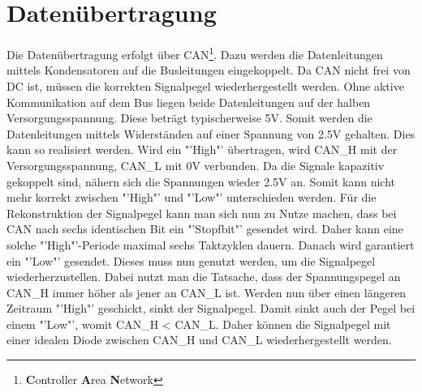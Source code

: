 \section{Datenübertragung}
Die Datenübertragung erfolgt über 
CAN\footnote{\textbf{C}ontroller \textbf{A}rea \textbf{N}etwork}. Dazu werden 
die Datenleitungen mittels Kondensatoren auf die Busleitungen eingekoppelt. Da 
CAN nicht frei von DC ist, müssen die korrekten Signalpegel wiederhergestellt 
werden. Ohne aktive Kommunikation auf dem Bus liegen beide Datenleitungen auf 
der halben Versorgungsspannung. Diese beträgt typischerweise 5\si{\volt}. 
Somit werden die Datenleitungen mittels Widerständen auf einer Spannung von 
2.5\si{\volt} gehalten. Dies kann so realisiert werden. Wird ein "'High"' 
übertragen, wird CAN\_H mit der Versorgungsspannung, CAN\_L mit 0\si{\volt} 
verbunden. Da die Signale kapazitiv gekoppelt sind, nähern sich die Spannungen 
wieder 2.5\si{\volt} an. Somit kann nicht mehr korrekt zwischen "'High"' und 
"'Low"' unterschieden werden. Für die Rekonstruktion der Signalpegel kann man 
sich nun zu Nutze machen, dass bei CAN nach sechs identischen Bit ein 
"'Stopfbit"' gesendet wird. Daher kann eine solche "'High"'-Periode maximal 
sechs Taktzyklen dauern. Danach wird garantiert ein "'Low"' gesendet. Dieses 
muss nun genutzt werden, um die Signalpegel wiederherzustellen. Dabei nutzt 
man die Tatsache, dass der Spannungspegel an CAN\_H immer höher als jener an 
CAN\_L ist. Werden nun über einen längeren Zeitraum "'High"' geschickt, sinkt 
der Signalpegel. Damit sinkt auch der Pegel bei einem "'Low"', womit CAN\_H < 
CAN\_L. Daher können die Signalpegel mit einer idealen Diode zwischen CAN\_H 
und CAN\_L wiederhergestellt werden. 
